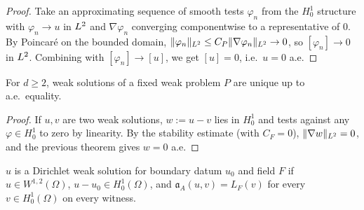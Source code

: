 \begin{proof}
\leanok
{}

Take an approximating sequence of smooth tests $\varphi_n$ from the $H^{1}_{0}$ structure with $\varphi_n \to u$ in $L^{2}$ and $\nabla \varphi_n$ converging componentwise to a representative of $0$. By Poincar\'e on the bounded domain, $\|\varphi_n\|_{L^{2}} \leq C_P \|\nabla \varphi_n\|_{L^{2}} \to 0$, so $[\varphi_n] \to 0$ in $L^{2}$. Combining with $[\varphi_n] \to [u]$, we get $[u] = 0$, i.e.\ $u = 0$ a.e.
\end{proof}

\begin{theorem}
\label{thm:weakProblem_unique}
\leanok
{}
For $d \geq 2$, weak solutions of a fixed weak problem $P$ are unique up to a.e.\ equality.
\end{theorem}

\begin{proof}
\leanok
{}

If $u, v$ are two weak solutions, $w := u - v$ lies in $H^{1}_{0}$ and tests against any $\varphi \in H^{1}_{0}$ to zero by linearity. By the stability estimate (with $C_F = 0$), $\|\nabla w\|_{L^{2}} = 0$, and the previous theorem gives $w = 0$ a.e.
\end{proof}

\begin{definition}
\label{def:IsDirichletWeakSolutionOfDivergenceData}
\leanok
{}
$u$ is a Dirichlet weak solution for boundary datum $u_0$ and field $F$ if $u \in W^{1,2}(\Omega)$, $u - u_0 \in H^{1}_{0}(\Omega)$, and $\mathfrak{a}_A(u, v) = L_F(v)$ for every $v \in H^{1}_{0}(\Omega)$ on every witness.
\end{definition}

